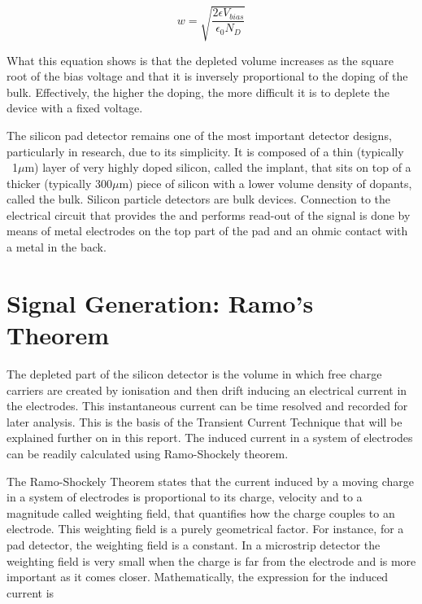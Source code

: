 \begin{equation}
w = \sqrt{\frac{2\epsilon V_{bias}}{\epsilon_0 N_D}}
\label{eq:widthVias}
\end{equation}

What this equation shows is that the depleted volume increases as the square
root of the bias voltage and that it is inversely proportional to the doping of the
bulk. Effectively, the higher the doping, the more difficult it is to deplete the
device with a fixed voltage. 

The silicon pad detector remains one of the most important detector designs,
particularly in research, due to its simplicity. It is composed of a thin
(typically ~1$\mu$m) layer of very highly doped silicon, called the implant,
that sits on top of a thicker (typically 300$\mu$m) piece of silicon with a
lower volume density of dopants, called the bulk. Silicon particle detectors are
bulk devices. Connection to the electrical circuit that provides the \vias and
performs read-out of the signal is done by means of metal electrodes on the top
part of the pad and an ohmic contact with a metal in the back. 

\section{Signal Generation: Ramo's Theorem} %
\label{sec:Ramo}

The depleted part of the silicon detector is the volume in which free
charge carriers are created by ionisation and then drift inducing an electrical
current in the electrodes. This instantaneous current can be time resolved and
recorded for later analysis. This is the basis of the Transient Current
Technique that will be explained further on in this report. The induced current
in a system of electrodes can be readily calculated using Ramo-Shockely theorem.


The Ramo-Shockely Theorem states that the current induced by a moving charge in
a system of electrodes is proportional to its charge, velocity and to a
magnitude called weighting field, that quantifies how the charge couples to an
electrode. This weighting field is a purely geometrical factor. For instance,
for a pad detector, the weighting field is a constant. In a microstrip detector
the weighting field is very small when the charge is far from the electrode and
is more important as it comes closer. Mathematically, the expression for the
induced current is

